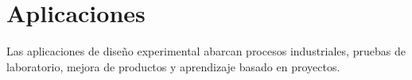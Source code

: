 \section{Aplicaciones}
Las aplicaciones de diseño experimental abarcan procesos industriales, pruebas de laboratorio, mejora de productos y aprendizaje basado en proyectos.